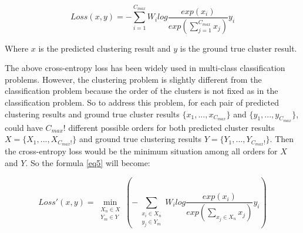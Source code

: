 \begin{equation}\label{eq5}
	Loss(x, y)= -\sum^{C_{max}}_{i=1}W_ilog\frac{exp(x_i)}{exp(\sum^{C_{max}}_{j=1}x_j)}y_i
\end{equation}

Where $x$ is the predicted clustering result and $y$ is the ground true cluster result. 

The above cross-entropy loss has been widely used in multi-class classification problems. However, the clustering problem is slightly different from the classification problem because the order of the clusters is not fixed as in the classification problem. So to address this problem, for each pair of predicted clustering results and ground true cluster results $\{x_1, ..., x_{C_{max}}\}$ and $\{y_1,...,y_{C_{max}}\}$, \tool could have $C_{max}!$ different possible orders for both predicted cluster results $X = \{X_1, ..., X_{C_{max}!}\}$ and ground true clustering results $Y = \{Y_1, ..., Y_{C_{max}!}\}$. Then the cross-entropy loss would be the minimum situation among all orders for $X$ and $Y$. So the formula \ref{eq5} will become:

\begin{equation}\label{eq6}
	Loss'(x, y)= \min\limits_{\substack{X_n \in X\\ Y_m \in Y}}(-\sum_{\substack{x_i\in X_n\\ y_j 
			\in Y_m}}W_ilog\frac{exp(x_i)}{exp(\sum\limits_{x_j \in X_n}x_j)}y_i)
\end{equation}
 

